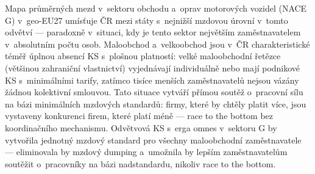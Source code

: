 Mapa průměrných mezd v~sektoru obchodu a~oprav motorových vozidel (\ac{NACE} G) v~\acs{geo-EU27} umísťuje ČR mezi státy s~nejnižší mzdovou úrovní v~tomto odvětví --- paradoxně v~situaci, kdy je tento sektor největším zaměstnavatelem v~absolutním počtu osob.
Maloobchod a~velkoobchod jsou v~ČR charakteristické téměř úplnou absencí \ac{KS} s~plošnou platností: velké maloobchodní řetězce (většinou zahraniční vlastnictví) vyjednávají individuálně nebo mají podnikové \ac{KS} s~minimálními tarify, zatímco tisíce menších zaměstnavatelů nejsou vázány žádnou kolektivní smlouvou.
Tato situace vytváří přímou soutěž o~pracovní sílu na bázi minimálních mzdových standardů: firmy, které by chtěly platit více, jsou vystaveny konkurenci firem, které platí méně --- race to the bottom bez koordinačního mechanismu.
Odvětvová \ac{KS} s~erga omnes v~sektoru G by vytvořila jednotný mzdový standard pro všechny maloobchodní zaměstnavatele --- eliminovala by mzdový dumping a~umožnila by lepším zaměstnavatelům soutěžit o~pracovníky na bázi nadstandardu, nikoliv race to the bottom.


